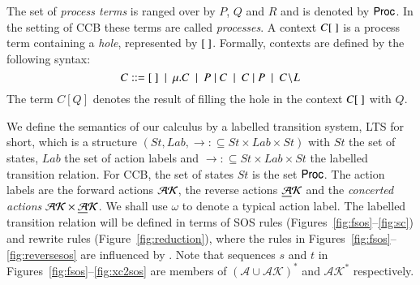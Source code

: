 {%
%

The set of \emph{process terms} is ranged over by $P$, $Q$ and $R$ and is denoted by $\mathsf{Proc}$. 
In the setting of CCB these terms are called \emph{processes}. 
A context $C[\ ]$ is a process term containing a \emph{hole}, represented by $[\ ]$. 
Formally, contexts are defined by the following syntax: 
$$C::= \hole\ \mid\ \mu.C\ \mid\  P\paral C \ \mid\  C \paral P \ \mid \ C\restrict L $$
The term $C[Q]$ denotes the result of filling the hole in the context $C[\ ]$ with $Q$.

We define the semantics of our calculus by a labelled transition system,
LTS for short, which is a structure $(St,\mathit{Lab},\rightarrow: \subseteq St \times \mathit{Lab} \times St)$
with $St$ the set of states, $\mathit{Lab}$ the set of action labels and $\rightarrow: 
\subseteq St \times \mathit{Lab} \times St$ the labelled transition relation.
For CCB, the set of states $St$ is the set $\mathsf{Proc}$. 
The action labels are the forward actions $\mathcal{AK}$, 
the reverse actions $\underline{\mathcal{A}}\mathcal{K}$ and the \emph{concerted actions} $\mathcal{AK} \times \underline{\mathcal{A}}\mathcal{K} $. We shall
use $\omega$ to denote a typical action label.
%
%
The labelled transition relation will be defined in terms of SOS rules (Figures~\ref{fig:fsos}--\ref{fig:sc}) 
and rewrite rules (Figure~\ref{fig:reduction}), where
the rules in Figures~\ref{fig:fsos}--\ref{fig:reversesos}
are influenced by \cite{PHILLIPS200770}.  
Note that sequences $s$ and $t$ in Figures~\ref{fig:fsos}--\ref{fig:xc2sos} 
are members of $(\mathcal{A}\cup\mathcal{AK})^*$ and $\mathcal{AK}^*$ respectively.

}
